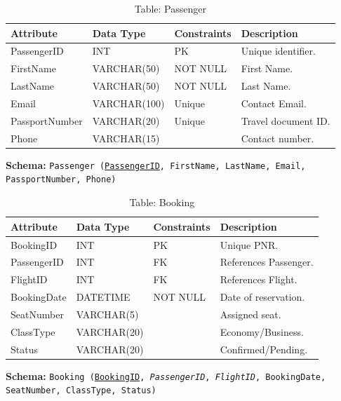 \documentclass[12pt, a4paper]{article}
\begin{document}
	\begin{table}[H]
		\centering
		\caption{Table: Passenger}
		\begin{tabular}{|l|l|l|p{5cm}|}
			\hline
			\textbf{Attribute} & \textbf{Data Type} & \textbf{Constraints} & \textbf{Description} \\
			\hline
			PassengerID & INT & PK & Unique identifier. \\
			\hline
			FirstName & VARCHAR(50) & NOT NULL & First Name. \\
			\hline
			LastName & VARCHAR(50) & NOT NULL & Last Name. \\
			\hline
			Email & VARCHAR(100) & Unique & Contact Email. \\
			\hline
			PassportNumber & VARCHAR(20) & Unique & Travel document ID. \\
			\hline
			Phone & VARCHAR(15) & & Contact number. \\
			\hline
		\end{tabular}
	\end{table}
	\noindent \textbf{Schema:} \texttt{Passenger (\underline{PassengerID}, FirstName, LastName, Email, PassportNumber, Phone)}
	
	\begin{table}[H]
		\centering
		\caption{Table: Booking}
		\begin{tabular}{|l|l|l|p{5cm}|}
			\hline
			\textbf{Attribute} & \textbf{Data Type} & \textbf{Constraints} & \textbf{Description} \\
			\hline
			BookingID & INT & PK & Unique PNR. \\
			\hline
			PassengerID & INT & FK & References Passenger. \\
			\hline
			FlightID & INT & FK & References Flight. \\
			\hline
			BookingDate & DATETIME & NOT NULL & Date of reservation. \\
			\hline
			SeatNumber & VARCHAR(5) & & Assigned seat. \\
			\hline
			ClassType & VARCHAR(20) & & Economy/Business. \\
			\hline
			Status & VARCHAR(20) & & Confirmed/Pending. \\
			\hline
		\end{tabular}
	\end{table}
	\noindent \textbf{Schema:} \texttt{Booking (\underline{BookingID}, \textit{PassengerID}, \textit{FlightID}, BookingDate, SeatNumber, ClassType, Status)}
	
\end{document}
